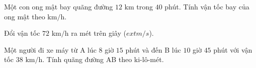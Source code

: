 \begin{ex} %
Một con ong mật bay quãng đường $12\text{ km}$ trong $40$ phút. Tính vận tốc bay của ong mật theo $\text{km/h}$.
\end{ex}

\begin{ex} %
Đổi vận tốc $72\text{ km/h}$ ra mét trên giây ($	ext{m/s}$).
\end{ex}

\begin{ex} %
Một người đi xe máy từ A lúc $8$ giờ $15$ phút và đến B lúc $10$ giờ $45$ phút với vận tốc $38\text{ km/h}$. Tính quãng đường AB theo ki-lô-mét.
\end{ex}
